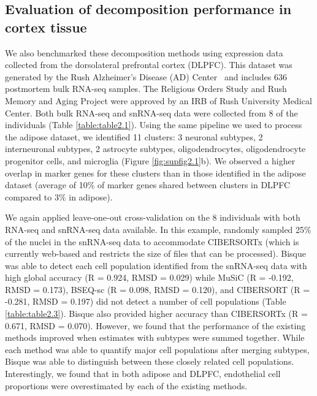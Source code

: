 \subsection{Evaluation of decomposition performance in cortex tissue}

We also benchmarked these decomposition methods using expression data collected from the dorsolateral prefrontal cortex (DLPFC). This dataset was generated by the Rush Alzheimer’s Disease (AD) Center~\cite{Mostafavi2018-ch}  and includes 636 postmortem bulk RNA-seq samples. The Religious Orders Study and Rush Memory and Aging Project were approved by an IRB of Rush University Medical Center. Both bulk RNA-seq and snRNA-seq data were collected from 8 of the individuals (Table \ref{table:table2.1}). Using the same pipeline we used to process the adipose dataset, we identified 11 clusters: 3 neuronal subtypes, 2 interneuronal subtypes, 2 astrocyte subtypes, oligodendrocytes, oligodendrocyte progenitor cells, and microglia (Figure \ref{fig:supfig2.1}b). We observed a higher overlap in marker genes for these clusters than in those identified in the adipose dataset (average of 10\% of marker genes shared between clusters in DLPFC compared to 3\% in adipose).
 	
We again applied leave-one-out cross-validation on the 8 individuals with both RNA-seq and snRNA-seq data available. In this example, randomly sampled 25\% of the nuclei in the snRNA-seq data to accommodate CIBERSORTx (which is currently web-based and restricts the size of files that can be processed). Bisque was able to detect each cell population identified from the snRNA-seq data with high global accuracy (R = 0.924, RMSD = 0.029) while MuSiC (R = -0.192, RMSD = 0.173), BSEQ-sc (R = 0.098, RMSD = 0.120), and CIBERSORT (R = -0.281, RMSD = 0.197) did not detect a number of cell populations (Table \ref{table:table2.3}). Bisque also provided higher accuracy than CIBERSORTx (R = 0.671, RMSD = 0.070). However, we found that the performance of the existing methods improved when estimates with subtypes were summed together. While each method was able to quantify major cell populations after merging subtypes, Bisque was able to distinguish between these closely related cell populations. Interestingly, we found that in both adipose and DLPFC, endothelial cell proportions were overestimated by each of the existing methods.

